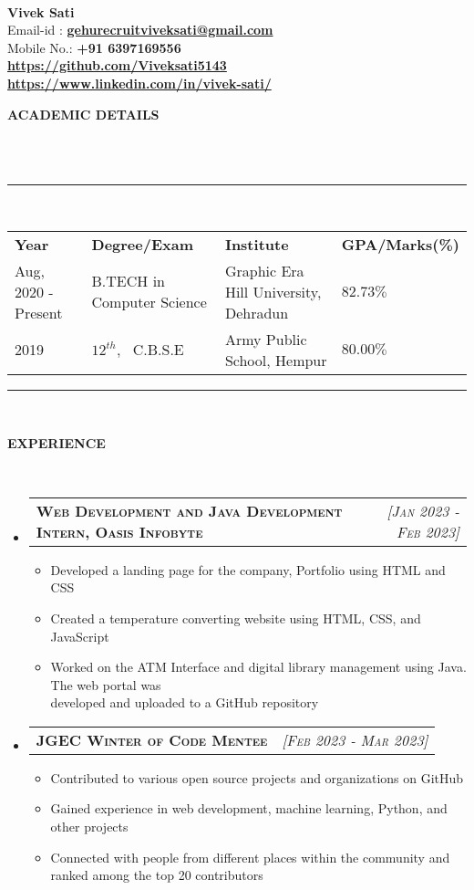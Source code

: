 \documentclass[a4paper,10pt]{article}
\makeatletter
\newcommand{\lsep}{-0.5cm}
\newcommand{\resitem}[1]{\item #1 \vspace{-2pt}}
\newcommand{\resheading}[1]{{\small \colorbox{mygrey}{\begin{minipage}{0.975\textwidth}{\textbf{#1 \vphantom{p\^{E}}}}\end{minipage}}}}
\newcommand{\ressubheading}[3]{
\begin{tabular*}{6.62in}{l @{\extracolsep{\fill}} r}
	\textsc{{\textbf{#1}}} & \textsc{\textit{[#2]}} \\
\end{tabular*}\vspace{-8pt}}
\makeatother
\begin{document}
\hspace{0.5cm}\\[-0.2cm]

\textbf{Vivek Sati} \\
\indent Email-id : \textbf{\url{gehurecruitviveksati@gmail.com}} \\
\indent Mobile No.: \textbf{+91 6397169556 } \ \\
\indent \textbf{\url{https://github.com/Viveksati5143}}\\
\indent \textbf{\url{https://www.linkedin.com/in/vivek-sati/}}\\

\resheading{\textbf{ACADEMIC DETAILS} }\\[\lsep]
\\
\indent \rule{6.8in}{0.4pt}\\
\indent \begin{tabular}{ l @{\hskip 0.15in} l @{\hskip 0.15in} l @{\hskip 0.15in} l @{\hskip 0.15in} }
\noindent \textbf{Year} & \textbf{Degree/Exam} & \textbf{Institute} & \textbf{GPA/Marks(\%)} \\
Aug, 2020 - Present & B.TECH in Computer Science & Graphic Era Hill University, Dehradun & $82.73 \%$ \\
2019 & $12^{th}$, \ C.B.S.E & Army Public School, Hempur & $80.00 \%$ \\

\end{tabular}
\indent \rule{6.8in}{0.4pt}
\\

\resheading{\textbf{EXPERIENCE} }\\[\lsep]
\begin{itemize}
\setlength\itemsep{0.5em}
\item \ressubheading{Web Development and Java Development Intern, Oasis Infobyte}{Jan 2023 - Feb 2023}{}
\begin{itemize}
    \resitem{Developed a landing page for the company, Portfolio using HTML and CSS}
    \resitem{Created a temperature converting website using HTML, CSS, and JavaScript}
    \resitem{Worked on the ATM Interface and digital library management using Java. The web portal was \\ developed and uploaded to a GitHub repository}
\end{itemize}
\item \ressubheading{JGEC Winter of Code Mentee}{Feb 2023 - Mar 2023}{}
\begin{itemize}
    \resitem{Contributed to various open source projects and organizations on GitHub}
    \resitem{Gained experience in web development, machine learning, Python, and other projects}
    \resitem{Connected with people from different places within the community and ranked among the top 20 contributors}
\end{itemize}
\end{itemize}
\end{document}
